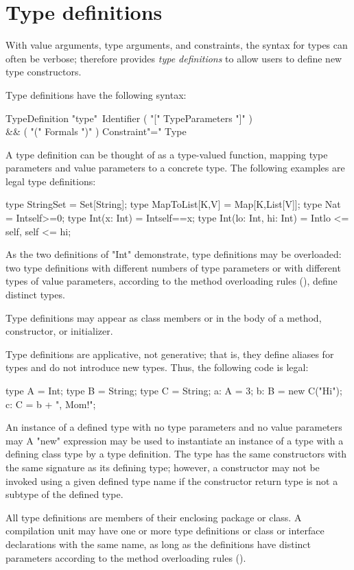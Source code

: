 
\section{Type definitions}

With value arguments, type arguments, and constraints, the
syntax for \Xten{} types can often be verbose;
\Xten{} therefore provides {\em type definitions}
to allow users to define new type constructors.

Type definitions have the following syntax:

\begin{grammar}
TypeDefinition \: 
                \xcd"type"~Identifier
                           ( \xcd"[" TypeParameters \xcd"]" )\opt \\
                        && ( \xcd"(" Formals \xcd")" )\opt
                            Constraint\opt \xcd"=" Type \\
\end{grammar}

\noindent
A type definition can be thought of as a type-valued function,
mapping type parameters and value parameters to a concrete type.
%
The following examples are legal type definitions:
\begin{xten}
type StringSet = Set[String];
type MapToList[K,V] = Map[K,List[V]];
type Nat = Int{self>=0};
type Int(x: Int) = Int{self==x};
type Int(lo: Int, hi: Int) = Int{lo <= self, self <= hi};
\end{xten}

As the two definitions of \xcd"Int" demonstrate, type definitions may 
be overloaded: two type definitions with different numbers of type
parameters or with different types of value
parameters, according to the method overloading rules
(), define distinct types.

Type definitions may appear as class members or in the body of a
method, constructor, or initializer.

Type definitions are applicative, not generative; that is, they
define aliases for types and do not introduce new types.
Thus, the following code is legal:
\begin{xten}
type A = Int;
type B = String;
type C = String;
a: A = 3;
b: B = new C("Hi");
c: C = b + ", Mom!";
\end{xten}
An instance of a defined type with no type parameters and no
value parameters may 
A \xcd"new" expression may be used to instantiate an instance
of a type with a defining class type
by a type definition.
The type
has the same constructors with the same signature as its defining type;
however, a
constructor may not be invoked using a given defined type 
name if the constructor return type is not a subtype of the
defined type.

All type definitions are members of their enclosing package or
class.  A compilation unit may have one or more type definitions
or class or interface declarations with the same name, as long
as the definitions have distinct parameters according to the
method overloading rules ().

